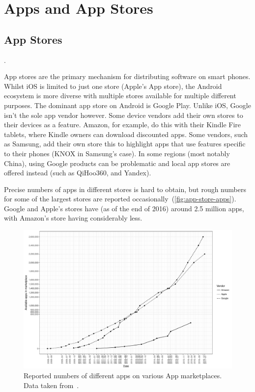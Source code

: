 \documentclass[thesis.tex]{subfiles}
\begin{document}
\chapter{Apps and App Stores}
\label{chap:apps-and-stores}

\section{App Stores}
.

App stores are the primary mechanism for distributing software on smart phones.
Whilst iOS is limited to just one store (Apple's App store), the Android ecosystem is more diverse with multiple stores available for multiple different purposes.
The dominant app store on Android is Google Play. 
Unlike iOS, Google isn't the sole app vendor however.
Some device vendors add their own stores to their devices as a feature.
Amazon, for example, do this with their Kindle Fire tablets, where Kindle owners can download discounted apps.
Some vendors, such as Samsung, add their own store this to highlight apps that use features specific to their phones (KNOX in Samsung's case).
In some regions (most notably China), using Google products can be problematic and local app stores are offered instead (such as QiHoo360, and Yandex).

Precise numbers of apps in different stores is hard to obtain, but rough numbers for some of the largest stores are reported occasionally~(\autoref{fig:app-store-apps}).
Google and Apple's stores have (as of the end of 2016) around 2.5 million apps, with Amazon's store having considerably less.

\begin{figure}
  \includegraphics[width=\textwidth]{figures/app-store-apps.pdf}
  \caption[Reported numbers of different apps on various App marketplaces.]{%
    Reported numbers of different apps on various App marketplaces. Data taken from~\cite{statista_google_nodate,statista_apple_nodate,statista_amazon_nodate}.}
  \label{fig:app-store-apps}
\end{figure}
\end{document}
